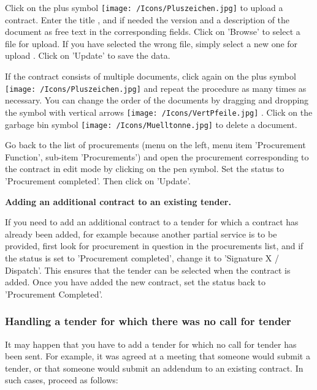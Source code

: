 Click on the plus symbol \texttt{[image: /Icons/Pluszeichen.jpg]}  to upload a contract. Enter the title , and if needed the version  and a description of the document  as free text in the corresponding fields. Click on 'Browse'  to select a file for upload. If you have selected the wrong file, simply select a new one for upload . Click on 'Update'  to save the data.

\vspace{\baselineskip}

If the contract consists of multiple documents, click again on the plus symbol \texttt{[image: /Icons/Pluszeichen.jpg]}  and repeat the procedure as many times as necessary. You can change the order of the documents by dragging and dropping the symbol with vertical arrows \texttt{[image: /Icons/VertPfeile.jpg]} . Click on the garbage bin symbol \texttt{[image: /Icons/Muelltonne.jpg]}  to delete a document.

\vspace{\baselineskip}

Go back to the list of procurements (menu on the left, menu item 'Procurement Function', sub-item 'Procurements') and open the procurement corresponding to the contract in edit mode by clicking on the pen symbol. Set the status to 'Procurement completed'. Then click on 'Update'.

\vspace{\baselineskip}

\textbf{Adding an additional contract to an existing tender.}

If you need to add an additional contract to a tender for which a contract has already been added, for example because another partial service is to be provided, first look for procurement in question in the procurements list, and if the status is set to 'Procurement completed', change it to 'Signature X / Dispatch'. This ensures that the tender can be selected when the contract is added. Once you have added the new contract, set the status back to 'Procurement Completed'.

\subsubsection{Handling a tender for which there was no call for tender}

It may happen that you have to add a tender for which no call for tender has been sent. For example, it was agreed at a meeting that someone would submit a tender, or that someone would submit an addendum to an existing contract. In such cases, proceed as follows:

